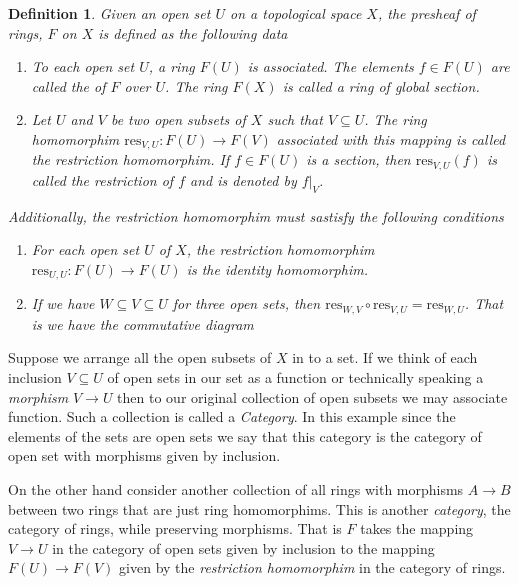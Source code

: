 \documentclass[]{report}
\newtheorem{defn}[theorem]{Definition}
\begin{document}
\begin{defn}
    Given an open set $U$ on a topological space $X$, the \textit{presheaf of rings}, $F$ on $X$ is defined as the following data
\begin{enumerate}
    \item To each open set $U$, a ring $F(U)$ is associated. The elements $f \in F(U)$ are called the  of $F$ over $U$. The ring $F(X)$ is called a ring of \textit{global section}.  
    \item Let $U$ and $V$ be two open subsets of $X$ such that $V \subseteq U$. The ring homomorphim $\text{res}_{V,U}: F(U) \rightarrow F(V)$ associated with this mapping is called the \textit{restriction homomorphim}. If $f \in F(U)$ is a section, then $\text{res}_{V,U}(f)$ is called the restriction of $f$ and is denoted by $f|_{V}$.
    \end{enumerate}

Additionally, the restriction homomorphim must sastisfy the following conditions
\begin{enumerate}
    \item For each open set $U$ of $X$, the restriction homomorphim $\text{res}_{U,U}: F(U) \rightarrow F(U)$ is the identity homomorphim.
    \item If we have $W \subseteq V \subseteq U$ for three open sets, then $\text{res}_{W,V} \circ \text{res}_{V,U} = \text{res}_{W,U}$. That is we have the commutative diagram

\end{enumerate}
\end{defn}

Suppose we arrange all the open subsets of $X$ in to a set. If we think of each inclusion $V \subseteq U$ of open sets in our set as a function or technically speaking a \textit{morphism} $V \rightarrow U$ then to our original collection of open subsets we may associate function. Such a collection is called a \textit{Category}. In this example since the elements of the sets are open sets we say that this category is the category of open set with morphisms given by inclusion.

On the other hand consider another collection of all rings with morphisms $A \rightarrow B$ between two rings that are just ring homomorphims. This is another \textit{category}, the category of rings, while preserving morphisms. That is $F$ takes the mapping $V \rightarrow U$ in the category of open sets given by inclusion to the mapping $F(U) \rightarrow F(V)$ given by the \textit{restriction homomorphim} in the category of rings.
\end{document}
